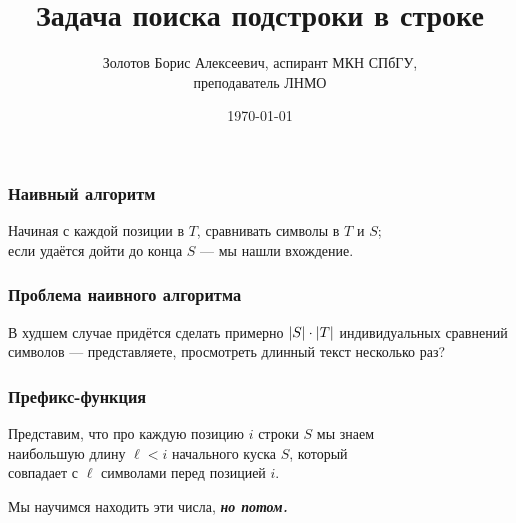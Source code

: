 \documentclass[11pt,aspectratio=169,svgnames]{beamer}
\title{Задача поиска подстроки в строке}
\date{\today}
\author{Золотов Борис Алексеевич, аспирант МКН СПбГУ, \\ преподаватель ЛНМО}
\institute{«Лига Лекторов», 3 сезон, полуфинал}
\DeclarePairedDelimiter{\len}{|}{|}
\begin{document}
 \maketitle

\begin{frame} \frametitle{Наивный алгоритм}
Начиная с каждой позиции в \(T\), сравнивать символы в \(T\) и \(S\);\\
если удаётся дойти до конца \(S\) — мы нашли вхождение. \bigskip

\begin{center}  \end{center}
\end{frame}


\begin{frame} \frametitle{Проблема наивного алгоритма}
В худшем случае придётся сделать примерно \(\len*{S} \cdot \len*{T}\) индивидуальных сравнений символов — представляете, просмотреть длинный текст несколько раз?
\end{frame}


\begin{frame} \frametitle{Префикс-функция}
Представим, что про каждую позицию \(i\) строки \(S\) мы знаем\\
наибольшую длину \(\ell< i\) начального куска \(S\), который\\
совпадает с \(\ell\) символами перед позицией \(i\). \bigskip

 \bigskip

Мы научимся находить эти числа, {\bfseries\itshape но потом.}
\end{frame}
\end{document}
